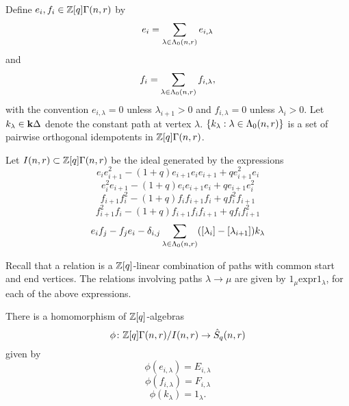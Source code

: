 \documentclass[a4paper, 11pt]{report}
\begin{document}
Define $e_i, f_i\in\mathbb{Z}[q]\Gamma(n,r)$ by
\begin{equation*}
e_i = \sum_{\lambda\in\Lambda_0(n,r)} e_{i,\lambda}
\end{equation*}
and
\begin{equation*}
f_i = \sum_{\lambda\in\Lambda_0(n,r)} f_{i,\lambda},
\end{equation*}
with the convention $e_{i,\lambda} = 0$ unless $\lambda_{i+1}>0$ and $f_{i,\lambda} = 0$ unless $\lambda_i>0$. Let $k_\lambda\in\mathbf{k}\Delta$ denote the constant path at vertex $\lambda$. $\{k_\lambda:\lambda\in\Lambda_0(n,r)\}$ is a set of pairwise orthogonal idempotents in $\mathbb{Z}[q]\Gamma(n,r)$.

Let $I(n,r)\subset\mathbb{Z}[q]\Gamma(n,r)$ be the ideal generated by the expressions
\begin{equation*}
e_i e_{i+1}^2 -(1+q)e_{i+1}e_ie_{i+1} + qe_{i+1}^2e_i
\end{equation*}
\begin{equation*}
e_i^2e_{i+1} - (1+q) e_ie_{i+1}e_i + qe_{i+1}e_i^2
\end{equation*}
\begin{equation*}
f_{i+1}f_i^2 - (1+q)f_if_{i+1} f_i + qf_i^2f_{i+1}
\end{equation*}
\begin{equation*}
f_{i+1}^2f_i - (1+q)f_{i+1}f_if_{i+1} + qf_if_{i+1}^2
\end{equation*}
\begin{equation*}
e_if_j - f_je_i - \delta_{i,j} \sum_{\lambda\in\Lambda_0(n,r)} ([\lambda_i]-[\lambda_{i+1}])k_\lambda
\end{equation*}

Recall that a relation is a $\mathbb{Z}[q]$-linear combination of paths with common start and end vertices. The relations involving paths $\lambda\to\mu$ are given by $1_\mu \text{expr} 1_\lambda$, for each of the above expressions.

\begin{lemma}
There is a homomorphism of $\mathbb{Z}[q]$-algebras
\begin{equation*}
\phi\colon\mathbb{Z}[q]\Gamma(n,r)/{I(n,r)}\to\hat{S}_q(n,r)
\end{equation*}
given by
\begin{equation*}
\phi(e_{i,\lambda}) = E_{i,\lambda}
\end{equation*}
\begin{equation*}
\phi(f_{i,\lambda}) = F_{i,\lambda}
\end{equation*}
\begin{equation*}
\phi(k_\lambda) = 1_\lambda.
\end{equation*}
\end{lemma}
\end{document}
